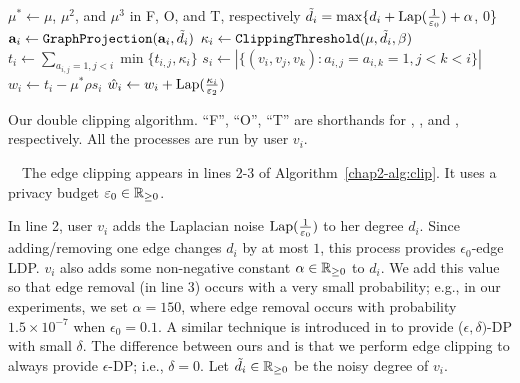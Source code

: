 \setlength{\algomargin}{5mm}
\begin{algorithm}[t]
  \SetAlgoLined
  $\mu^* \leftarrow \mu$, $\mu^2$, and $\mu^3$ in F, O, and T, respectively\;
  $\tilde{d}_i = \max\{d_i + \textrm{Lap}(\frac{1}{\varepsilon_0}) + \alpha$, 0\}\;
  $\mathbf{a}_i \leftarrow \texttt{GraphProjection}(\mathbf{a}_i, \tilde{d}_i)$\;
  $\kappa_i \leftarrow \texttt{ClippingThreshold}(\mu, \tilde{d}_i, \beta)$\;
  $t_i \leftarrow \sum_{a_{i,j} = 1, j<i} \min \{t_{i,j}, \kappa_i\}$\;
  $s_i \leftarrow |\{(v_i,v_j,v_k) : a_{i,j} = a_{i,k} = 1, j<k<i\}|$\;
  $w_i \leftarrow t_i - \mu^* \rho s_i$\;
  $\hat{w}_i \leftarrow w_i + \textrm{Lap}(\frac{\kappa_i}{\varepsilon_2})$\;
  \caption[Our double clipping algorithm.]{Our double clipping algorithm. 
  ``F'', ``O'', ``T'' are shorthands for 
  \AlgOne{}, \AlgTwo{}, and \AlgThree{}, respectively.
  All the processes are run by user $v_i$.
  }\label{chap2-alg:clip}
\end{algorithm}

\smallskip
{}~~The edge clipping appears in lines 2-3 of Algorithm~\ref{chap2-alg:clip}. 
It uses a privacy budget $\varepsilon_0 \in \mathbb{R}_{\ge0}$. 

In line 2, user $v_i$ adds the Laplacian noise $\textrm{Lap}(\frac{1}{\varepsilon_0})$ to her degree $d_i$. 
Since adding/removing one edge changes $d_i$ by at most $1$, this process provides $\epsilon_0$-edge LDP. 
$v_i$ also adds some non-negative constant 
$\alpha \in \mathbb{R}_{\ge0}$ 
to $d_i$. 
We add this value so that edge removal (in line 3) occurs with a very small probability; 
e.g., in our experiments, we set $\alpha = 150$, where 
edge removal occurs with probability $1.5 \times 10^{-7}$ when $\epsilon_0 = 0.1$. 
A similar technique is introduced in \cite{Sun_CCS19} to provide ($\epsilon, \delta)$-DP \cite{DP} with small $\delta$. 
The difference between ours and \cite{Sun_CCS19} is that we perform edge clipping 
to always provide $\epsilon$-DP; i.e., $\delta = 0$.
Let $\tilde{d}_i \in \mathbb{R}_{\ge0}$ be the noisy degree of $v_i$.

